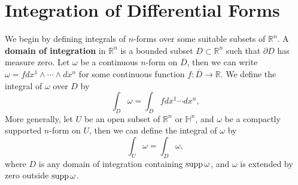 \documentclass[../main.tex]{subfiles}
\begin{document}
\section{Integration of Differential Forms}
We begin by defining integrals of $n$-forms over some suitable subsets of $\mathbb{R}^n$. A \textbf{domain of integration} in $\mathbb{R}^n$ is a bounded subset $D\subset \mathbb{R}^n$ such that $\partial D$ has measure zero. Let $\omega$ be a continuous $n$-form on $\overline{D}$, then we can write $\omega=f dx^1\wedge \cdots \wedge dx^n$ for some continuous function $f:\overline{D}\to \mathbb{R}$. We define the integral of $\omega$ over $D$ by
\begin{equation}
  \int_D \omega = \int_D f dx^1\cdots dx^n,
\end{equation}
More generally, let $U$ be an open subset of $\mathbb{R}^n$ or $\mathbb{H}^n$, and $\omega$ be a compactly supported $n$-form on $U$, then we can define the integral of $\omega$ by
\begin{equation*}
  \int_U \omega = \int_D \omega,
\end{equation*}
where $D$ is any domain of integration containing $\operatorname{supp} \omega$, and $\omega$ is extended by zero outside $\operatorname{supp} \omega$.
\end{document}
